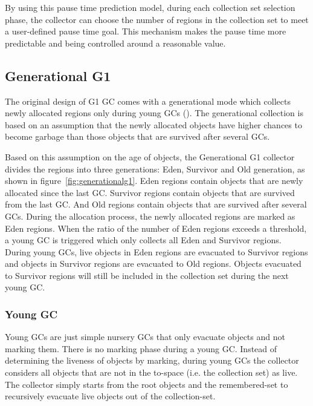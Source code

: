 By using this pause time prediction model, during each collection set selection phase,
the collector can choose the number of regions in the collection set to meet a
user-defined pause time goal. This mechanism makes the pause time more predictable
and being controlled around a reasonable value.

\subsection{Generational G1}

The original design of G1 GC comes with a generational mode which collects newly allocated regions only during young GCs (\cite{detlefs2004garbage}).
The generational collection is based on an assumption that the newly allocated objects
have higher chances to become garbage than those objects that are survived after several GCs.

Based on this assumption on the age of objects, the Generational G1 collector divides the regions into three generations: Eden, Survivor and Old generation,
as shown in figure~\ref{fig:generationalg1}.
Eden regions contain objects that are newly allocated since the last GC.
Survivor regions contain objects that are survived from the last GC.
And Old regions contain objects that are survived after several GCs.
During the allocation process, the newly allocated regions are marked as Eden regions.
When the ratio of the number of Eden regions exceeds a  threshold,
a young GC is triggered which only collects all Eden and Survivor regions.
During young GCs, live objects in Eden regions are evacuated to Survivor regions
and objects in Survivor regions are evacuated to Old regions.
Objects evacuated to Survivor regions will still be included in the collection set during the next young GC.

\begin{figure*}
  \centering
  \texttt{[image: \{figs/generational.png]}}
  \caption{Generational G1 Heap Structure}
  \label{fig:generationalg1}
\end{figure*}

\subsubsection{Young GC}

Young GCs are just simple nursery GCs that only evacuate objects and not marking them.
There is no marking phase during a young GC. Instead of determining the liveness of objects
by marking, during young GCs the collector considers all objects that are not in the
to-space (i.e. the collection set) as live. The collector simply starts from the root
objects and the remembered-set to recursively evacuate live objects out of the collection-set.

